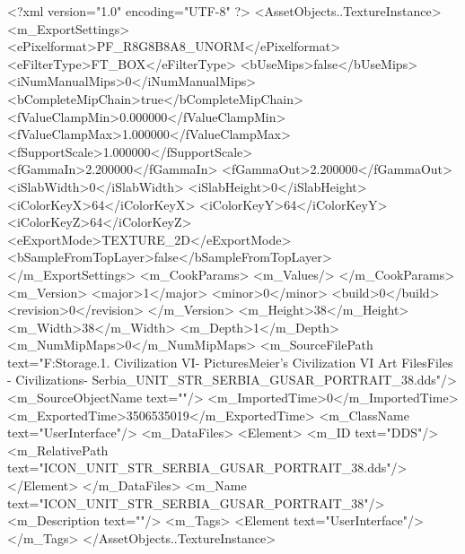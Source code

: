<?xml version="1.0" encoding="UTF-8" ?>
<AssetObjects..TextureInstance>
	<m_ExportSettings>
		<ePixelformat>PF_R8G8B8A8_UNORM</ePixelformat>
		<eFilterType>FT_BOX</eFilterType>
		<bUseMips>false</bUseMips>
		<iNumManualMips>0</iNumManualMips>
		<bCompleteMipChain>true</bCompleteMipChain>
		<fValueClampMin>0.000000</fValueClampMin>
		<fValueClampMax>1.000000</fValueClampMax>
		<fSupportScale>1.000000</fSupportScale>
		<fGammaIn>2.200000</fGammaIn>
		<fGammaOut>2.200000</fGammaOut>
		<iSlabWidth>0</iSlabWidth>
		<iSlabHeight>0</iSlabHeight>
		<iColorKeyX>64</iColorKeyX>
		<iColorKeyY>64</iColorKeyY>
		<iColorKeyZ>64</iColorKeyZ>
		<eExportMode>TEXTURE_2D</eExportMode>
		<bSampleFromTopLayer>false</bSampleFromTopLayer>
	</m_ExportSettings>
	<m_CookParams>
		<m_Values/>
	</m_CookParams>
	<m_Version>
		<major>1</major>
		<minor>0</minor>
		<build>0</build>
		<revision>0</revision>
	</m_Version>
	<m_Height>38</m_Height>
	<m_Width>38</m_Width>
	<m_Depth>1</m_Depth>
	<m_NumMipMaps>0</m_NumMipMaps>
	<m_SourceFilePath text="F:\Mod Storage\2.1. Civilization VI\Mods\Archive - Pictures\Sid Meier's Civilization VI Art Files\Art Files - Civilizations\Civilization - Serbia\ICON_UNIT_STR_SERBIA_GUSAR_PORTRAIT_38.dds"/>
	<m_SourceObjectName text=""/>
	<m_ImportedTime>0</m_ImportedTime>
	<m_ExportedTime>3506535019</m_ExportedTime>
	<m_ClassName text="UserInterface"/>
	<m_DataFiles>
		<Element>
			<m_ID text="DDS"/>
			<m_RelativePath text="ICON_UNIT_STR_SERBIA_GUSAR_PORTRAIT_38.dds"/>
		</Element>
	</m_DataFiles>
	<m_Name text="ICON_UNIT_STR_SERBIA_GUSAR_PORTRAIT_38"/>
	<m_Description text=""/>
	<m_Tags>
		<Element text="UserInterface"/>
	</m_Tags>
</AssetObjects..TextureInstance>

